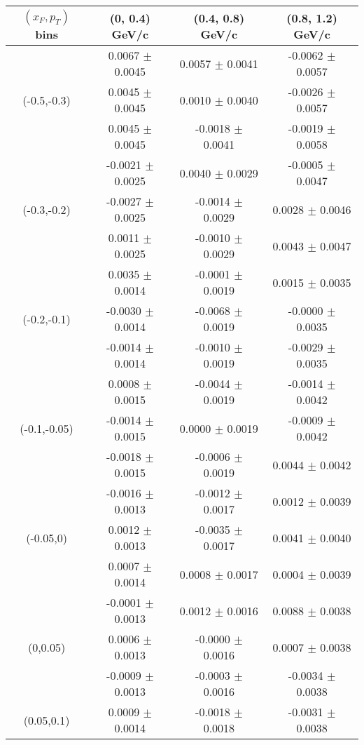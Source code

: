 \begin{table}[]
\begin{tabular}{|c|c|c|c|}
\hline
$(x_{F},p_{T}) $ bins         & (0, 0.4) GeV/c          & (0.4, 0.8) GeV/c          & (0.8, 1.2) GeV/c           \\ \hline
\multirow{3}{*}{(-0.5,-0.3)}& 0.0067 $\pm$ 0.0045 & 0.0057 $\pm$ 0.0041 & -0.0062 $\pm$ 0.0057  \\
& 0.0045 $\pm$ 0.0045 & 0.0010 $\pm$ 0.0040 & -0.0026 $\pm$ 0.0057  \\
& 0.0045 $\pm$ 0.0045 & -0.0018 $\pm$ 0.0041 & -0.0019 $\pm$ 0.0058  \\ \hline
\multirow{3}{*}{(-0.3,-0.2)}& -0.0021 $\pm$ 0.0025 & 0.0040 $\pm$ 0.0029 & -0.0005 $\pm$ 0.0047  \\
& -0.0027 $\pm$ 0.0025 & -0.0014 $\pm$ 0.0029 & 0.0028 $\pm$ 0.0046  \\
& 0.0011 $\pm$ 0.0025 & -0.0010 $\pm$ 0.0029 & 0.0043 $\pm$ 0.0047  \\ \hline
\multirow{3}{*}{(-0.2,-0.1)}& 0.0035 $\pm$ 0.0014 & -0.0001 $\pm$ 0.0019 & 0.0015 $\pm$ 0.0035  \\
& -0.0030 $\pm$ 0.0014 & -0.0068 $\pm$ 0.0019 & -0.0000 $\pm$ 0.0035  \\
& -0.0014 $\pm$ 0.0014 & -0.0010 $\pm$ 0.0019 & -0.0029 $\pm$ 0.0035  \\ \hline
\multirow{3}{*}{(-0.1,-0.05)}& 0.0008 $\pm$ 0.0015 & -0.0044 $\pm$ 0.0019 & -0.0014 $\pm$ 0.0042  \\
& -0.0014 $\pm$ 0.0015 & 0.0000 $\pm$ 0.0019 & -0.0009 $\pm$ 0.0042  \\
& -0.0018 $\pm$ 0.0015 & -0.0006 $\pm$ 0.0019 & 0.0044 $\pm$ 0.0042  \\ \hline
\multirow{3}{*}{(-0.05,0)}& -0.0016 $\pm$ 0.0013 & -0.0012 $\pm$ 0.0017 & 0.0012 $\pm$ 0.0039  \\
& 0.0012 $\pm$ 0.0013 & -0.0035 $\pm$ 0.0017 & 0.0041 $\pm$ 0.0040  \\
& 0.0007 $\pm$ 0.0014 & 0.0008 $\pm$ 0.0017 & 0.0004 $\pm$ 0.0039  \\ \hline
\multirow{3}{*}{(0,0.05)}& -0.0001 $\pm$ 0.0013 & 0.0012 $\pm$ 0.0016 & 0.0088 $\pm$ 0.0038  \\
& 0.0006 $\pm$ 0.0013 & -0.0000 $\pm$ 0.0016 & 0.0007 $\pm$ 0.0038  \\
& -0.0009 $\pm$ 0.0013 & -0.0003 $\pm$ 0.0016 & -0.0034 $\pm$ 0.0038  \\ \hline
\multirow{3}{*}{(0.05,0.1)}& 0.0009 $\pm$ 0.0014 & -0.0018 $\pm$ 0.0018 & -0.0031 $\pm$ 0.0038  \\

\end{tabular}
\end{table}
